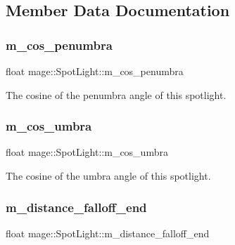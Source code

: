 \subsection{Member Data Documentation}
\hypertarget{classmage_1_1_spot_light_ac5d9f3426397abff72c5098b6e7e8472}{}\label{classmage_1_1_spot_light_ac5d9f3426397abff72c5098b6e7e8472} 
\subsubsection{\texorpdfstring{m\+\_\+cos\+\_\+penumbra}{m\_cos\_penumbra}}
{\footnotesize\ttfamily float mage\+::\+Spot\+Light\+::m\+\_\+cos\+\_\+penumbra\hspace{0.3cm}{\ttfamily [private]}}

The cosine of the penumbra angle of this spotlight. \hypertarget{classmage_1_1_spot_light_a9afab31514f93d702f9e516491f262f2}{}\label{classmage_1_1_spot_light_a9afab31514f93d702f9e516491f262f2} 
\subsubsection{\texorpdfstring{m\+\_\+cos\+\_\+umbra}{m\_cos\_umbra}}
{\footnotesize\ttfamily float mage\+::\+Spot\+Light\+::m\+\_\+cos\+\_\+umbra\hspace{0.3cm}{\ttfamily [private]}}

The cosine of the umbra angle of this spotlight. \hypertarget{classmage_1_1_spot_light_a8e0616e3a36d1a05d800cc4a43739178}{}\label{classmage_1_1_spot_light_a8e0616e3a36d1a05d800cc4a43739178} 
\subsubsection{\texorpdfstring{m\+\_\+distance\+\_\+falloff\+\_\+end}{m\_distance\_falloff\_end}}
{\footnotesize\ttfamily float mage\+::\+Spot\+Light\+::m\+\_\+distance\+\_\+falloff\+\_\+end\hspace{0.3cm}{\ttfamily [private]}}

